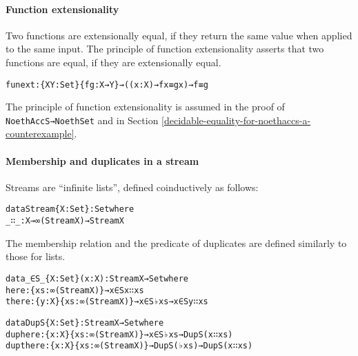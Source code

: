 \documentclass{eptcs}
\begin{document}
\paragraph{Function extensionality}
Two functions are extensionally equal, if they return the same value
when applied to the same input. The principle of function
extensionality asserts that two functions are equal, if they are extensionally equal.
\begin{alltt}
funext : \{X Y : Set\} \{f g : X → Y\} → ((x : X) → f x ≡ g x) → f ≡ g
\end{alltt}
The principle of function extensionality is assumed in the proof of
\verb;NoethAccS→NoethSet; and in Section
\ref{decidable-equality-for-noethaccs-a-counterexample}. 

\paragraph{Membership and duplicates in a stream}
Streams are ``infinite lists'', defined coinductively as
follows:
\begin{alltt}
data Stream \{X : Set\} : Set where
  _∷_ : X → ∞ (Stream X) → Stream X
\end{alltt}
The membership relation and the predicate of duplicates 
are defined similarly to those for lists.
\begin{alltt}
data _∈S_ \{X : Set\} (x : X) : Stream X → Set where
  here  : \{xs : ∞ (Stream X)\} → x ∈S x ∷ xs
  there : \{y : X\} \{xs : ∞ (Stream X)\} → x ∈S ♭ xs → x ∈S y ∷ xs
\end{alltt}
\begin{alltt}
data DupS \{X : Set\} : Stream X → Set where
  duphere  : \{x : X\} \{xs : ∞ (Stream X)\} → x ∈S ♭ xs → DupS (x ∷ xs)
  dupthere : \{x : X\} \{xs : ∞ (Stream X)\} → DupS (♭ xs) → DupS (x ∷ xs)
\end{alltt}
\end{document}
